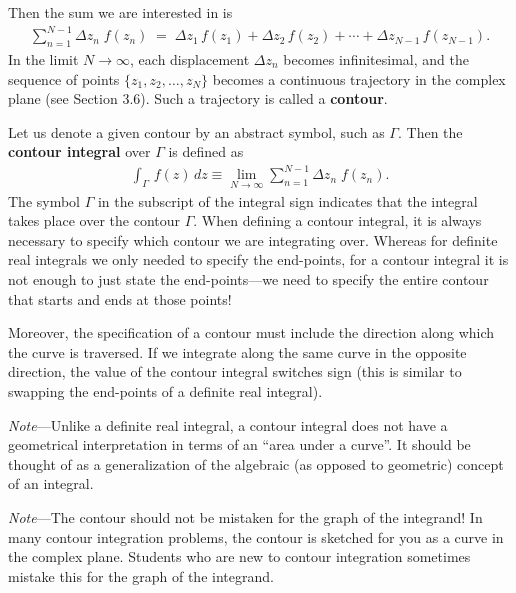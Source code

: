 \documentclass[10pt,a4paper]{article}
\begin{document}
\noindent
Then the sum we are interested in is
\begin{align}
  \sum_{n=1}^{N-1} \Delta z_n\; f(z_n) \;=\; \Delta z_1\, f(z_1) + \Delta z_2\, f(z_2) + \cdots + \Delta z_{N-1}\, f(z_{N-1}).
\end{align}
In the limit $N \rightarrow \infty$, each displacement $\Delta z_{n}$
becomes infinitesimal, and the sequence of points $\{z_1, z_2, \dots,
z_N\}$ becomes a continuous trajectory in the complex plane (see
Section 3.6). Such a trajectory is called a \textbf{contour}.

Let us denote a given contour by an abstract symbol, such as
$\Gamma$. Then the \textbf{contour integral} over $\Gamma$ is defined
as
\begin{align}
  \int_\Gamma \, f(z)\, dz \equiv \lim_{N \rightarrow \infty} \sum_{n=1}^{N-1} \Delta z_n\; f(z_n).
\end{align}
The symbol $\Gamma$ in the subscript of the integral sign indicates
that the integral takes place over the contour $\Gamma$. When defining
a contour integral, it is always necessary to specify which contour we
are integrating over.  Whereas for definite real integrals we only
needed to specify the end-points, for a contour integral it is not
enough to just state the end-points---we need to specify the entire
contour that starts and ends at those points!

Moreover, the specification of a contour must include the direction
along which the curve is traversed. If we integrate along the same
curve in the opposite direction, the value of the contour integral
switches sign (this is similar to swapping the end-points of a
definite real integral).

\begin{framed}\noindent
  \textit{Note}---Unlike a definite real integral, a contour integral
  does not have a geometrical interpretation in terms of an ``area
  under a curve''. It should be thought of as a generalization of the
  algebraic (as opposed to geometric) concept of an integral.
\end{framed}

\begin{framed}\noindent
  \textit{Note}---The contour should not be mistaken for the graph of
  the integrand! In many contour integration problems, the contour is
  sketched for you as a curve in the complex plane. Students who are
  new to contour integration sometimes mistake this for the graph of
  the integrand.
\end{framed}
\end{document}
